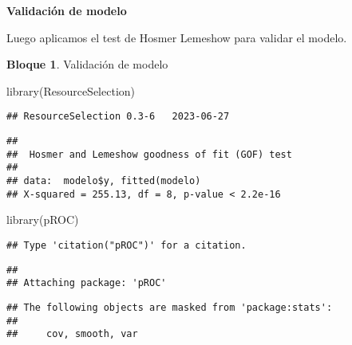 \documentclass[
]{book}
\newenvironment{Shaded}{\begin{snugshade}}{\end{snugshade}}
\newcommand{\AttributeTok}[1]{\textcolor[rgb]{0.77,0.63,0.00}{#1}}
\newcommand{\CommentTok}[1]{\textcolor[rgb]{0.56,0.35,0.01}{\textit{#1}}}
\newcommand{\DecValTok}[1]{\textcolor[rgb]{0.00,0.00,0.81}{#1}}
\newcommand{\FunctionTok}[1]{\textcolor[rgb]{0.00,0.00,0.00}{#1}}
\newcommand{\NormalTok}[1]{#1}
\newcommand{\SpecialCharTok}[1]{\textcolor[rgb]{0.00,0.00,0.00}{#1}}
\theoremstyle{definition}
\theoremstyle{definition}
\newtheorem{example}{Bloque}[chapter]
\theoremstyle{definition}
\theoremstyle{definition}
\theoremstyle{remark}
\begin{document}
\textbf{Validación de modelo}

Luego aplicamos el test de Hosmer Lemeshow para validar el modelo.

\begin{example}
\protect\hypertarget{exm:bloque17nbm}{}\label{exm:bloque17nbm}Validación de modelo
\end{example}

\begin{Shaded}
\begin{Highlighting}[]
\FunctionTok{library}\NormalTok{(ResourceSelection)}
\end{Highlighting}
\end{Shaded}

\begin{verbatim}
## ResourceSelection 0.3-6   2023-06-27
\end{verbatim}

\begin{Shaded}
\end{Shaded}

\begin{verbatim}
## 
##  Hosmer and Lemeshow goodness of fit (GOF) test
## 
## data:  modelo$y, fitted(modelo)
## X-squared = 255.13, df = 8, p-value < 2.2e-16
\end{verbatim}

\begin{Shaded}
\begin{Highlighting}[]
\FunctionTok{library}\NormalTok{(pROC)}
\end{Highlighting}
\end{Shaded}

\begin{verbatim}
## Type 'citation("pROC")' for a citation.
\end{verbatim}

\begin{verbatim}
## 
## Attaching package: 'pROC'
\end{verbatim}

\begin{verbatim}
## The following objects are masked from 'package:stats':
## 
##     cov, smooth, var
\end{verbatim}
\end{document}
